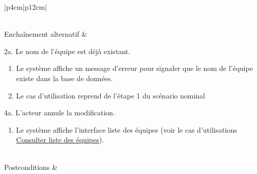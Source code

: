 \begin{longtable}{|p{4cm}|p{12cm}|}
\begin{minipage}[t]{\linewidth}
\begin{enumerate}[itemindent=0pt, leftmargin=*, nosep,after=\vspace{-\baselineskip},before=\vspace{-0.5\baselineskip}]
                    \end{enumerate}
                    \end{minipage}
                     \\
                    \hline
                    Enchaînement alternatif &  
                    \begin{minipage}[t]{\linewidth}
                        2a. Le nom de l'équipe est déjà existant.
                        \begin{enumerate}[nosep,after=\strut]
                              \item Le système affiche un message d'erreur pour signaler que le nom de l'équipe existe dans la base de données.
                              \item Le cas d’utilisation reprend de l’étape 1 du scénario nominal
                        \end{enumerate}
                        4a. L'acteur annule la modification.
                        \begin{enumerate}[nosep,after=\strut]
                              \item Le système affiche l'interface liste des équipes (voir le cas d’utilisations \underline{Consulter liste des équipes}).
                        \end{enumerate}
                    \end{minipage}
                    \\
                    
                    \hline
                    Postconditions &   \\
                    \hline
                    \caption{Description du cas d'utilisation « Modifier équipe »}\\
            \end{longtable}

